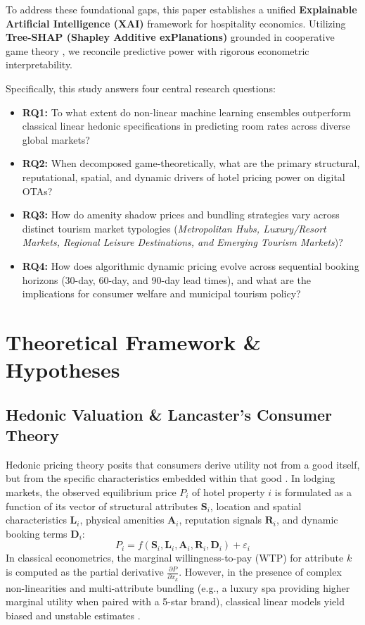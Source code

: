 \documentclass[11pt,a4paper]{article}
\begin{document}
To address these foundational gaps, this paper establishes a unified \textbf{Explainable Artificial Intelligence (XAI)} framework for hospitality economics. Utilizing \textbf{Tree-SHAP (Shapley Additive exPlanations)} grounded in cooperative game theory \citep{lundberg2017}, we reconcile predictive power with rigorous econometric interpretability. 

Specifically, this study answers four central research questions:
\begin{itemize}[leftmargin=*]
    \item \textbf{RQ1:} To what extent do non-linear machine learning ensembles outperform classical linear hedonic specifications in predicting room rates across diverse global markets?
    \item \textbf{RQ2:} When decomposed game-theoretically, what are the primary structural, reputational, spatial, and dynamic drivers of hotel pricing power on digital OTAs?
    \item \textbf{RQ3:} How do amenity shadow prices and bundling strategies vary across distinct tourism market typologies (\textit{Metropolitan Hubs, Luxury/Resort Markets, Regional Leisure Destinations, and Emerging Tourism Markets})?
    \item \textbf{RQ4:} How does algorithmic dynamic pricing evolve across sequential booking horizons (30-day, 60-day, and 90-day lead times), and what are the implications for consumer welfare and municipal tourism policy?
\end{itemize}

\section{Theoretical Framework \& Hypotheses}

\subsection{Hedonic Valuation \& Lancaster's Consumer Theory}
Hedonic pricing theory posits that consumers derive utility not from a good itself, but from the specific characteristics embedded within that good \citep{lancaster1966, rosen1974}. In lodging markets, the observed equilibrium price $P_i$ of hotel property $i$ is formulated as a function of its vector of structural attributes $\mathbf{S}_i$, location and spatial characteristics $\mathbf{L}_i$, physical amenities $\mathbf{A}_i$, reputation signals $\mathbf{R}_i$, and dynamic booking terms $\mathbf{D}_i$:
\begin{equation}
P_i = f(\mathbf{S}_i, \mathbf{L}_i, \mathbf{A}_i, \mathbf{R}_i, \mathbf{D}_i) + \varepsilon_i
\end{equation}
In classical econometrics, the marginal willingness-to-pay (WTP) for attribute $k$ is computed as the partial derivative $\frac{\partial P}{\partial x_k}$. However, in the presence of complex non-linearities and multi-attribute bundling (e.g., a luxury spa providing higher marginal utility when paired with a 5-star brand), classical linear models yield biased and unstable estimates \citep{chen2010, schamel2012}.
\end{document}
